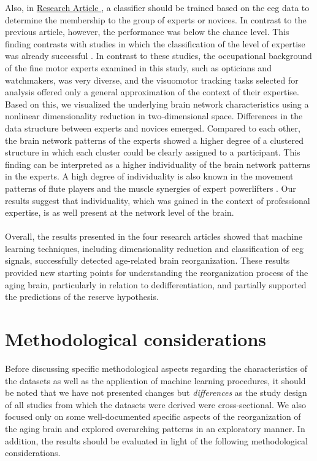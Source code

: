 Also, in \hyperref[results:paperIV]{Research Article }, a classifier should be trained based on the \gls{eeg} data to determine the membership to the group of experts or novices. In contrast to the previous article, however, the performance was below the chance level. This finding contrasts with studies in which the classification of the level of expertise was already successful \cite{Hosp2021, Winkler-Schwartz2019, Shourie2016}. In contrast to these studies, the occupational background of the fine motor experts examined in this study, such as opticians and watchmakers, was very diverse, and the visuomotor tracking tasks selected for analysis offered only a general approximation of the context of their expertise. Based on this, we visualized the underlying brain network characteristics using a nonlinear dimensionality reduction in two-dimensional space. Differences in the data structure between experts and novices emerged. Compared to each other, the brain network patterns of the experts showed a higher degree of a clustered structure in which each cluster could be clearly assigned to a participant. This finding can be interpreted as a higher individuality of the brain network patterns in the experts. A high degree of individuality is also known in the movement patterns of flute players and the muscle synergies of expert powerlifters \cite{Albrecht2014, Caramiaux2018, Kristiansen2015}. Our results suggest that individuality, which was gained in the context of professional expertise, is as well present at the network level of the brain.\\
\\
Overall, the results presented in the four research articles showed that machine learning techniques, including dimensionality reduction and classification of \gls{eeg} signals, successfully detected age-related brain reorganization. These results provided new starting points for understanding the reorganization process of the aging brain, particularly in relation to dedifferentiation, and partially supported the predictions of the reserve hypothesis.

\section{Methodological considerations}
Before discussing specific methodological aspects regarding the characteristics of the datasets as well as the application of machine learning procedures, it should be noted that we have not presented changes but \textit{differences} as the study design of all studies from which the datasets were derived were cross-sectional. We also focused only on some well-documented specific aspects of the reorganization of the aging brain and explored overarching patterns in an exploratory manner. In addition, the results should be evaluated in light of the following methodological considerations. 

